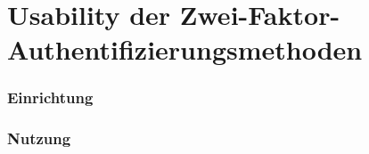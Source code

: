 \chapter{Usability der Zwei-Faktor-Authentifizierungsmethoden}
\subsection{Einrichtung}
\subsection{Nutzung}
